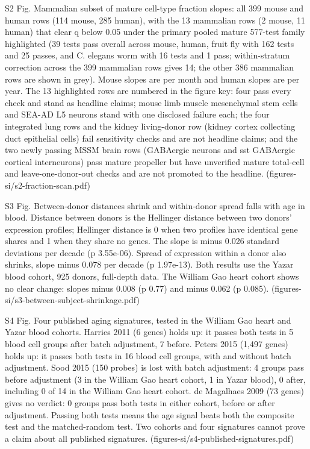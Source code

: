 \documentclass[11pt]{article}
\begin{document}
S2 Fig. Mammalian subset of mature cell-type fraction slopes: all 399 mouse and human rows (114 mouse, 285 human), with the 13 mammalian rows (2 mouse, 11 human) that clear q below 0.05 under the primary pooled mature 577-test family highlighted (39 tests pass overall across mouse, human, fruit fly with 162 tests and 25 passes, and C. elegans worm with 16 tests and 1 pass; within-stratum correction across the 399 mammalian rows gives 14; the other 386 mammalian rows are shown in grey). Mouse slopes are per month and human slopes are per year. The 13 highlighted rows are numbered in the figure key: four pass every check and stand as headline claims; mouse limb muscle mesenchymal stem cells and SEA-AD L5 neurons stand with one disclosed failure each; the four integrated lung rows and the kidney living-donor row (kidney cortex collecting duct epithelial cells) fail sensitivity checks and are not headline claims; and the two newly passing MSSM brain rows (GABAergic neurons and sst GABAergic cortical interneurons) pass mature propeller but have unverified mature total-cell and leave-one-donor-out checks and are not promoted to the headline. (figures-si/s2-fraction-scan.pdf)

S3 Fig. Between-donor distances shrink and within-donor spread falls with age in blood. Distance between donors is the Hellinger distance between two donors' expression profiles; Hellinger distance is 0 when two profiles have identical gene shares and 1 when they share no genes. The slope is minus 0.026 standard deviations per decade (p 3.55e-06). Spread of expression within a donor also shrinks, slope minus 0.078 per decade (p 1.97e-13). Both results use the Yazar blood cohort, 925 donors, full-depth data. The William Gao heart cohort shows no clear change: slopes minus 0.008 (p 0.77) and minus 0.062 (p 0.085). (figures-si/s3-between-subject-shrinkage.pdf)

S4 Fig. Four published aging signatures, tested in the William Gao heart and Yazar blood cohorts. Harries 2011 (6 genes) holds up: it passes both tests in 5 blood cell groups after batch adjustment, 7 before. Peters 2015 (1,497 genes) holds up: it passes both tests in 16 blood cell groups, with and without batch adjustment. Sood 2015 (150 probes) is lost with batch adjustment: 4 groups pass before adjustment (3 in the William Gao heart cohort, 1 in Yazar blood), 0 after, including 0 of 14 in the William Gao heart cohort. de Magalhaes 2009 (73 genes) gives no verdict: 0 groups pass both tests in either cohort, before or after adjustment. Passing both tests means the age signal beats both the composite test and the matched-random test. Two cohorts and four signatures cannot prove a claim about all published signatures. (figures-si/s4-published-signatures.pdf)
\end{document}
